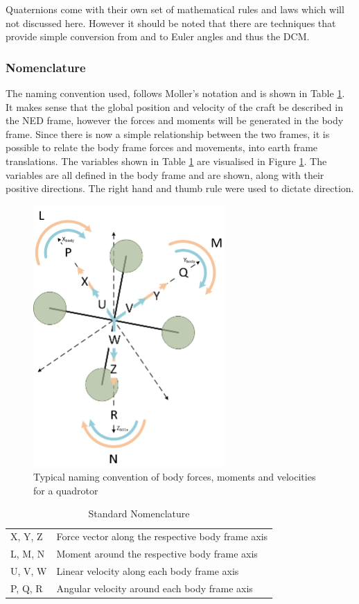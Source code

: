 		Quaternions come with their own set of mathematical rules and laws which will not discussed here. However it should be noted that there are techniques that provide simple conversion from and to Euler angles and thus the DCM.  
		
		\subsubsection{Nomenclature}
		The naming convention used, follows Moller's notation \cite{Moller2015} and is shown in Table \ref{tab:Nomenclature}. It makes sense that the global position and velocity of the craft be described in the NED frame, however the forces and moments will be generated in the body frame. Since there is now a simple relationship between the two frames, it is possible to relate the body frame forces and movements, into earth frame translations. The variables shown in Table \ref{tab:Nomenclature} are visualised in Figure \ref{IM_Nomenclature}. The variables are all defined in the body frame and are shown, along with their positive directions. The right hand and thumb rule were used to dictate direction.
		
		\begin{figure}[H]
			\centering
			\includegraphics[height = 10cm]{Images/Literature/ForcesMoments.jpg}     
			\caption{Typical naming convention of body forces, moments and velocities for a quadrotor}
			\label{IM_Nomenclature}
		\end{figure}
		
		\begin{table}[!]
			\centering
			\begin{tabular}{| l | l |}
				X, Y, Z 	& Force vector along the respective body frame axis\\
				L, M, N 	& Moment around the respective body frame axis\\
				U, V, W 	& Linear velocity along each body frame axis\\
				P, Q, R  	& Angular velocity around each body frame axis\\
			\end{tabular}
			\caption{Standard Nomenclature}
			\label{tab:Nomenclature}
		\end{table}
		
